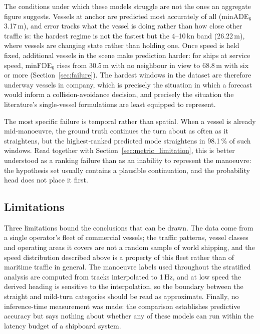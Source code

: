 \documentclass[12pt, a4paper]{article}
\begin{document}
  The conditions under which these models struggle are not the ones an aggregate
  figure suggests.  Vessels at anchor are predicted most accurately of all
  (minADE$_6$ 3.17\,m), and error tracks what the vessel is doing rather than how
  close other traffic is: the hardest regime is not the fastest but the 4--10\,kn
  band (26.22\,m), where vessels are changing state rather than holding one.
  Once speed is held fixed, additional vessels in the scene make
  prediction harder: for ships at service speed, minFDE$_6$ rises from 30.5\,m
  with no neighbour in view to 68.8\,m with six or more
  (Section~\ref{sec:failure}).  The hardest windows in the dataset are therefore
  underway vessels in company, which is precisely the situation in which a
  forecast would inform a collision-avoidance decision, and precisely the
  situation the literature's single-vessel formulations are least equipped to
  represent.

  The most specific failure is temporal rather than spatial.  When a vessel is
  already mid-manoeuvre, the ground truth continues the turn about as often as it
  straightens, but the highest-ranked predicted mode straightens in 98.1\,\% of
  such windows.  Read together with Section~\ref{sec:metric_limitation}, this is
  better understood as a ranking failure than as an inability to represent the
  manoeuvre: the hypothesis set usually contains a plausible continuation, and
  the probability head does not place it first.

  \subsection{Limitations}

  Three limitations bound the conclusions that can be drawn.  The data come from
  a single operator's fleet of commercial vessels; the traffic patterns,
  vessel classes and operating areas it covers are not a random sample of world
  shipping, and the speed distribution described above is a property of this
  fleet rather than of maritime traffic in general.  The manoeuvre labels used
  throughout the stratified analysis are computed from tracks interpolated to
  1\,Hz, and at low speed the derived heading is sensitive to the interpolation,
  so the boundary between the straight and mild-turn categories should be read as
  approximate.  Finally, no inference-time measurement was made: the comparison
  establishes predictive accuracy but says nothing about whether any of these
  models can run within the latency budget of a shipboard system.
\end{document}
